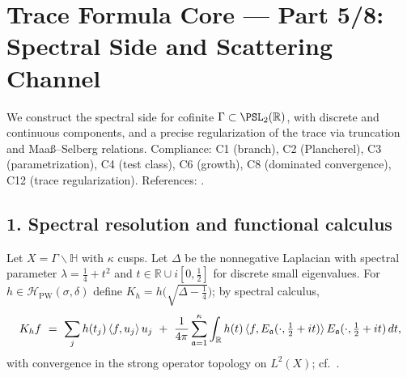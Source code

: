 \section*{Trace Formula Core — Part 5/8: Spectral Side and Scattering Channel}\relax\hspace{0pt}
\label{sec:tfc-part5} %

\noindent
We construct the spectral side for cofinite $\Gamma\subset\PSL_2(\mathbb{R})$, with discrete and continuous components, and a precise regularization of the trace via truncation and Maaß--Selberg relations. \relax\hspace{0pt}
Compliance: C1 (branch), C2 (Plancherel), C3 (parametrization), C4 (test class), C6 (growth), C8 (dominated convergence), C12 (trace regularization). \relax\hspace{0pt}
References: \cite{SelbergCollected,HejhalI,HejhalII,IwaniecSpectral,LaxPhillips,Borthwick,GuillopeZworski,ColinDeVerdiere}. %

\subsection*{1. Spectral resolution and functional calculus}\relax\hspace{0pt}
\label{subsec:tfc5-spec} %

Let $X=\Gamma\backslash\mathbb{H}$ with $\kappa$ cusps. \relax\hspace{0pt}
Let $\Delta$ be the nonnegative Laplacian with spectral parameter $\lambda=\frac{1}{4}+t^2$ and $t\in\mathbb{R}\cup i[0,\frac12]$ for discrete small eigenvalues. \relax\hspace{0pt}
For $h\in\mathcal{H}_{\mathrm{PW}}(\sigma,\delta)$ define $K_h=h\!\big(\sqrt{\Delta-\tfrac14}\big)$; by spectral calculus,
\begin{equation}\relax\hspace{0pt}
\label{eq:tfc5-spectral-decomp}\relax\hspace{0pt}
K_h f\ =\ \sum_{j} h(t_j)\,\langle f,u_j\rangle\,u_j\ +\ \frac{1}{4\pi}\sum_{\mathfrak{a}=1}^{\kappa}\int_{\mathbb{R}} h(t)\,\langle f,E_{\mathfrak{a}}(\cdot,\tfrac12+it)\rangle\,E_{\mathfrak{a}}(\cdot,\tfrac12+it)\,dt,
\end{equation}
with convergence in the strong operator topology on $L^2(X)$; cf.\ \cite{HejhalI,HejhalII}. \relax\hspace{0pt}

